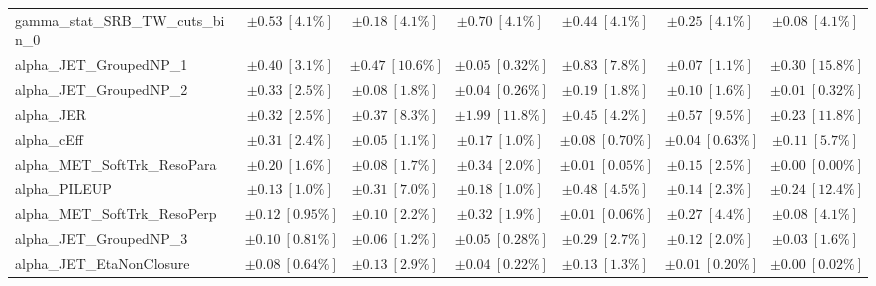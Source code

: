 \begin{sidewaystable}
\begin{center}
\begin{tabular*}{\textwidth}{@{\extracolsep{\fill}}lcccccc}
gamma\_stat\_SRB\_TW\_cuts\_bin\_0         & $\pm 0.53\ [4.1\%] $          & $\pm 0.18\ [4.1\%] $          & $\pm 0.70\ [4.1\%] $          & $\pm 0.44\ [4.1\%] $          & $\pm 0.25\ [4.1\%] $          & $\pm 0.08\ [4.1\%] $       \\
alpha\_JET\_GroupedNP\_1         & $\pm 0.40\ [3.1\%] $          & $\pm 0.47\ [10.6\%] $          & $\pm 0.05\ [0.32\%] $          & $\pm 0.83\ [7.8\%] $          & $\pm 0.07\ [1.1\%] $          & $\pm 0.30\ [15.8\%] $       \\
alpha\_JET\_GroupedNP\_2         & $\pm 0.33\ [2.5\%] $          & $\pm 0.08\ [1.8\%] $          & $\pm 0.04\ [0.26\%] $          & $\pm 0.19\ [1.8\%] $          & $\pm 0.10\ [1.6\%] $          & $\pm 0.01\ [0.32\%] $       \\
alpha\_JER         & $\pm 0.32\ [2.5\%] $          & $\pm 0.37\ [8.3\%] $          & $\pm 1.99\ [11.8\%] $          & $\pm 0.45\ [4.2\%] $          & $\pm 0.57\ [9.5\%] $          & $\pm 0.23\ [11.8\%] $       \\
alpha\_cEff         & $\pm 0.31\ [2.4\%] $          & $\pm 0.05\ [1.1\%] $          & $\pm 0.17\ [1.0\%] $          & $\pm 0.08\ [0.70\%] $          & $\pm 0.04\ [0.63\%] $          & $\pm 0.11\ [5.7\%] $       \\
alpha\_MET\_SoftTrk\_ResoPara         & $\pm 0.20\ [1.6\%] $          & $\pm 0.08\ [1.7\%] $          & $\pm 0.34\ [2.0\%] $          & $\pm 0.01\ [0.05\%] $          & $\pm 0.15\ [2.5\%] $          & $\pm 0.00\ [0.00\%] $       \\
alpha\_PILEUP         & $\pm 0.13\ [1.0\%] $          & $\pm 0.31\ [7.0\%] $          & $\pm 0.18\ [1.0\%] $          & $\pm 0.48\ [4.5\%] $          & $\pm 0.14\ [2.3\%] $          & $\pm 0.24\ [12.4\%] $       \\
alpha\_MET\_SoftTrk\_ResoPerp         & $\pm 0.12\ [0.95\%] $          & $\pm 0.10\ [2.2\%] $          & $\pm 0.32\ [1.9\%] $          & $\pm 0.01\ [0.06\%] $          & $\pm 0.27\ [4.4\%] $          & $\pm 0.08\ [4.1\%] $       \\
alpha\_JET\_GroupedNP\_3         & $\pm 0.10\ [0.81\%] $          & $\pm 0.06\ [1.2\%] $          & $\pm 0.05\ [0.28\%] $          & $\pm 0.29\ [2.7\%] $          & $\pm 0.12\ [2.0\%] $          & $\pm 0.03\ [1.6\%] $       \\
alpha\_JET\_EtaNonClosure         & $\pm 0.08\ [0.64\%] $          & $\pm 0.13\ [2.9\%] $          & $\pm 0.04\ [0.22\%] $          & $\pm 0.13\ [1.3\%] $          & $\pm 0.01\ [0.20\%] $          & $\pm 0.00\ [0.02\%] $       \\

\end{tabular*}
\end{center}
\end{sidewaystable}
